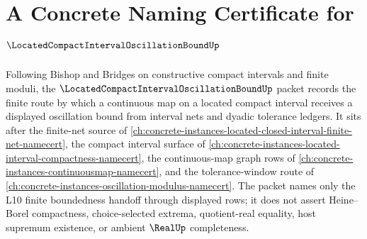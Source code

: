 \chapter{A Concrete Naming Certificate for $\LocatedCompactIntervalOscillationBoundUp$}
\label{ch:concrete-instances-located-compact-interval-oscillation-bound-namecert}

Following Bishop and Bridges on constructive compact intervals and finite moduli, the $\LocatedCompactIntervalOscillationBoundUp$ packet records the finite route by which a continuous map on a located compact interval receives a displayed oscillation bound from interval nets and dyadic tolerance ledgers. It sits after the finite-net source of \autoref{ch:concrete-instances-located-closed-interval-finite-net-namecert}, the compact interval surface of \autoref{ch:concrete-instances-located-interval-compactness-namecert}, the continuous-map graph rows of \autoref{ch:concrete-instances-continuousmap-namecert}, and the tolerance-window route of \autoref{ch:concrete-instances-oscillation-modulus-namecert}. The packet names only the L10 finite boundedness handoff through displayed rows; it does not assert Heine--Borel compactness, choice-selected extrema, quotient-real equality, host supremum existence, or ambient $\RealUp$ completeness.

